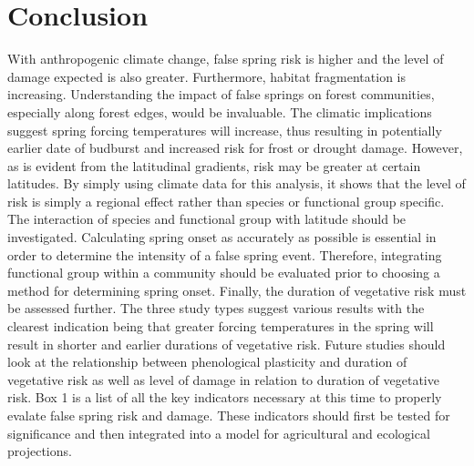 \documentclass{article}\usepackage[]{graphicx}\usepackage[]{color}
\begin{document}
\section{Conclusion}
With anthropogenic climate change, false spring risk is higher and the level of damage expected is also greater. Furthermore, habitat fragmentation is increasing. Understanding the impact of false springs on forest communities, especially along forest edges, would be invaluable. The climatic implications suggest spring forcing temperatures will increase, thus resulting in potentially earlier date of budburst and increased risk for frost or drought damage. However, as is evident from the latitudinal gradients, risk may be greater at certain latitudes. By simply using climate data for this analysis, it shows that the level of risk is simply a regional effect rather than species or functional group specific. The interaction of species and functional group with latitude should be investigated. Calculating spring onset as accurately as possible is essential in order to determine the intensity of a false spring event. Therefore, integrating functional group within a community should be evaluated prior to choosing a method for determining spring onset. Finally, the duration of vegetative risk must be assessed further. The three study types suggest various results with the clearest indication being that greater forcing temperatures in the spring will result in shorter and earlier durations of vegetative risk. Future studies should look at the relationship between phenological plasticity and duration of vegetative risk as well as level of damage in relation to duration of vegetative risk. Box 1 is a list of all the key indicators necessary at this time to properly evalate false spring risk and damage. These indicators should first be tested for significance and then integrated into a model for agricultural and ecological projections. 
\end{document}
